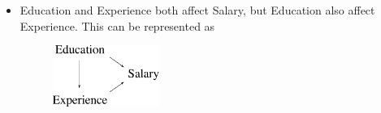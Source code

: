 \begin{itemize}
	\item Education and Experience both affect Salary, but Education also affect Experience. This can be represented as
	\begin{figure}[h!]
	\centering
		\includegraphics[height=20mm]{./figs/04-education-salary.pdf} 
	\end{figure}



\end{itemize}





